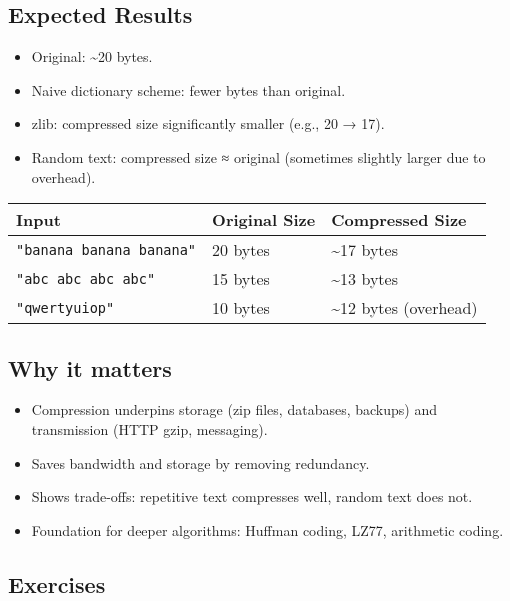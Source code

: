 \documentclass[
  letterpaper,
  DIV=11,
  numbers=noendperiod]{scrreprt}
\providecommand{\tightlist}{%
  \setlength{\itemsep}{0pt}\setlength{\parskip}{0pt}}
\begin{document}
\subsection{Expected Results}\label{expected-results-13}

\begin{itemize}
\tightlist
\item
  Original: \textasciitilde20 bytes.
\item
  Naive dictionary scheme: fewer bytes than original.
\item
  zlib: compressed size significantly smaller (e.g., 20 → 17).
\item
  Random text: compressed size ≈ original (sometimes slightly larger due
  to overhead).
\end{itemize}

\begin{longtable}[]{@{}lll@{}}
\toprule\noalign{}
Input & Original Size & Compressed Size \\
\midrule\noalign{}
\endhead
\bottomrule\noalign{}
\endlastfoot
\texttt{"banana\ banana\ banana"} & 20 bytes & \textasciitilde17
bytes \\
\texttt{"abc\ abc\ abc\ abc"} & 15 bytes & \textasciitilde13 bytes \\
\texttt{"qwertyuiop"} & 10 bytes & \textasciitilde12 bytes (overhead) \\
\end{longtable}

\subsection{Why it matters}\label{why-it-matters-58}

\begin{itemize}
\tightlist
\item
  Compression underpins storage (zip files, databases, backups) and
  transmission (HTTP gzip, messaging).
\item
  Saves bandwidth and storage by removing redundancy.
\item
  Shows trade-offs: repetitive text compresses well, random text does
  not.
\item
  Foundation for deeper algorithms: Huffman coding, LZ77, arithmetic
  coding.
\end{itemize}

\subsection{Exercises}\label{exercises-57}
\end{document}
